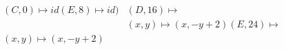\documentclass[preview]{standalone}
\begin{document}
\begin{align*}
(C,0) \mapsto id (E,8) \mapsto id) &(D,16) \mapsto \\& (x,y) \mapsto (x, -y + 2) (E,24) \mapsto \\ (x,y) \mapsto (x, -y + 2)
\end{align*}
\end{document}
